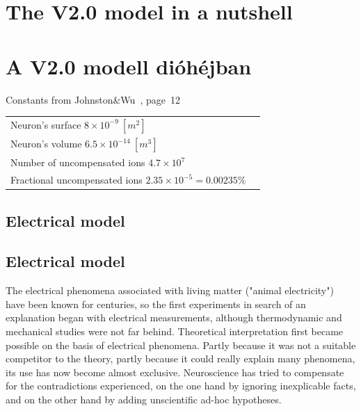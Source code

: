 
\ifx\magyar\undefined
\chapter[The V2.0 model]{The V2.0 model in a nutshell\label{ch:Modell-Nutshell}}
\else
\chapter[A V2.0 modell]{A V2.0 modell dióhéjban\label{sec:Modell-Nutshell}}
\fi

\iflatexml
\else
\minitoc
\fi

{Constants from Johnston\&Wu~\cite{JohnstonWuNeurophysiology:1995}, page~12}
{
\begin{tabular}{ll}

Neuron's surface $8\times 10^{-9}\ [m^2]$\\
Neuron's volume $6.5\times 10^{-14}\ [m^3]$\\

Number of uncompensated ions $4.7\times 10^{7} $\\
Fractional uncompensated ions $2.35\times 10^{-5} = 0.00235\%$\\
\end{tabular}
}

%
%



	
	


\ifx\magyar\undefined
\section[Electrical model]{Electrical model\label{sec:V2-0_ElectricModel}}
\else
\section[Electrical model]{Electrical model\label{sec:V2-0_ElectricModel}}
\fi


\ifx\magyar\undefined

The electrical phenomena associated with living matter ("animal electricity") have been known for centuries, so the first experiments in search of an explanation began with electrical measurements, although thermodynamic and mechanical studies were not far behind. Theoretical interpretation first became possible on the basis of electrical phenomena. Partly because it was not a suitable competitor to the theory, partly because it could really explain many phenomena, its use has now become almost exclusive. Neuroscience has tried to compensate for the contradictions experienced, on the one hand by ignoring inexplicable facts, and on the other hand by adding unscientific ad-hoc hypotheses.

